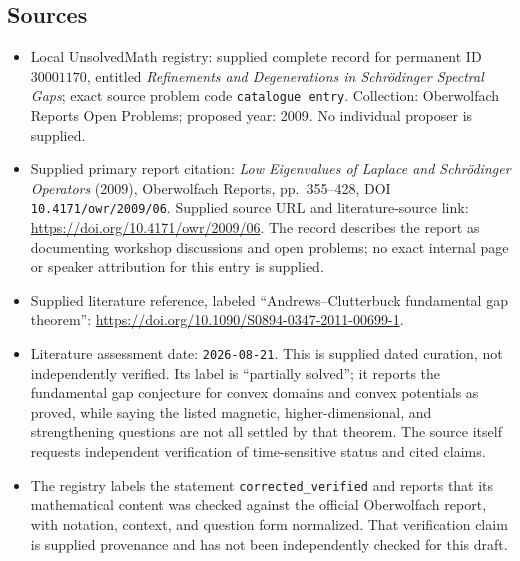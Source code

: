 \documentclass[11pt]{article}
\begin{document}
\subsection{Sources}
\begin{itemize}
\item Local UnsolvedMath registry: supplied complete record for permanent ID \(30001170\), entitled \emph{Refinements and Degenerations in Schrödinger Spectral Gaps}; exact source problem code \texttt{catalogue entry}. Collection: Oberwolfach Reports Open Problems; proposed year: 2009. No individual proposer is supplied.
\item Supplied primary report citation: \emph{Low Eigenvalues of Laplace and Schrödinger Operators} (2009), Oberwolfach Reports, pp.\ 355--428, DOI \texttt{10.4171/owr/2009/06}. Supplied source URL and literature-source link: \url{https://doi.org/10.4171/owr/2009/06}. The record describes the report as documenting workshop discussions and open problems; no exact internal page or speaker attribution for this entry is supplied.
\item Supplied literature reference, labeled ``Andrews--Clutterbuck fundamental gap theorem'': \url{https://doi.org/10.1090/S0894-0347-2011-00699-1}.
\item Literature assessment date: \texttt{2026-08-21}. This is supplied dated curation, not independently verified. Its label is ``partially solved''; it reports the fundamental gap conjecture for convex domains and convex potentials as proved, while saying the listed magnetic, higher-dimensional, and strengthening questions are not all settled by that theorem. The source itself requests independent verification of time-sensitive status and cited claims.
\item The registry labels the statement \texttt{corrected\_verified} and reports that its mathematical content was checked against the official Oberwolfach report, with notation, context, and question form normalized. That verification claim is supplied provenance and has not been independently checked for this draft.
\end{itemize}
\end{document}
